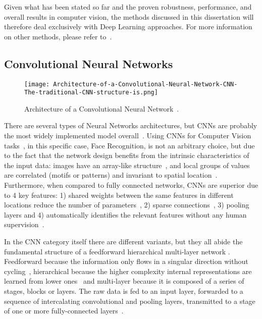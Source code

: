 \documentclass[class=report, crop=false, a4paper, 12pt]{standalone}
\begin{document}
\par Given what has been stated so far and the proven robustness, performance, and overall results in computer vision, the methods discussed in this dissertation will therefore deal exclusively with Deep Learning approaches. For more information on other methods, please refer to~\autocite{learned-millerLabeledFacesWild2016}. 

\subsection{Convolutional Neural Networks}
\begin{figure}[!h]
    \centering
    \texttt{[image: Architecture-of-a-Convolutional-Neural-Network-CNN-The-traditional-CNN-structure-is.png]}
    \caption{Architecture of a Convolutional Neural Network~\autocite{kangDeepSimilarityMetric2019}.}
    \label{fig:cnn}
\end{figure}


\par There are several types of Neural Networks architectures, but CNNs are probably the most widely implemented model overall~\autocite{yamashitaConvolutionalNeuralNetworks2018, liSurveyConvolutionalNeural2022}. Using CNNs for Computer Vision tasks~\autocite{krizhevskyImageNetClassificationDeep2012,taigmanDeepFaceClosingGap2014,tompsonEfficientObjectLocalization2015, zhangImprovedBreastCancer2021}, in this specific case, Face Recognition, is not an arbitrary choice, but due to the fact that the network design benefits from the intrinsic characteristics of the input data: images have an array-like structure~\autocite{yamashitaConvolutionalNeuralNetworks2018}, and local groups of values are correlated (motifs or patterns) and invariant to spatial location~\autocite{lecunDeepLearning2015,caoReviewNeuralNetworks2018}. Furthermore, when compared to fully connected networks, CNNs are superior due to 4 key features: 1) shared weights between the same features in different locations reduce the number of parameters~\autocite{liSurveyConvolutionalNeural2022}, 2) sparse connections~\autocite{alzubaidiReviewDeepLearning2021}, 3) pooling layers and 4) automatically identifies the relevant features without any human supervision~\autocite{alzubaidiReviewDeepLearning2021,liSurveyConvolutionalNeural2022}.

\par In the CNN category itself there are different variants, but they all abide the fundamental structure of a feedforward hierarchical multi-layer network . Feedforward because the information only flows in a singular direction without cycling~\autocite{zellSimulationNeuronalerNetze1994}, hierarchical because the higher complexity internal representations are learned from lower ones~\autocite{lecunDeepLearning2015, zhuBCNNBranchConvolutional2017} and multi-layer because it is composed of a series of stages, blocks or layers. The raw data is fed to an input layer, forwarded to a sequence of intercalating convolutional and pooling layers, transmitted to a stage of one or more fully-connected layers~\autocite{lecunDeepLearning2015, guRecentAdvancesConvolutional2018, alzubaidiReviewDeepLearning2021}.   
\end{document}
